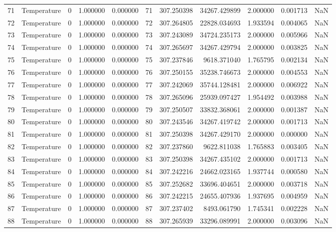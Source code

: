 \begin{tabular}{llrrrrrrrrr}
71 & Temperature & 0 & 1.000000 & 0.000000 & 71 & 307.250398 & 34267.429899 & 2.000000 & 0.001713 & NaN \\
72 & Temperature & 0 & 1.000000 & 0.000000 & 72 & 307.264805 & 22828.034693 & 1.933594 & 0.004065 & NaN \\
73 & Temperature & 0 & 1.000000 & 0.000000 & 73 & 307.243089 & 34724.235173 & 2.000000 & 0.005966 & NaN \\
74 & Temperature & 0 & 1.000000 & 0.000000 & 74 & 307.265697 & 34267.429794 & 2.000000 & 0.003825 & NaN \\
75 & Temperature & 0 & 1.000000 & 0.000000 & 75 & 307.237846 & 9618.371040 & 1.765795 & 0.002134 & NaN \\
76 & Temperature & 0 & 1.000000 & 0.000000 & 76 & 307.250155 & 35238.746673 & 2.000000 & 0.004553 & NaN \\
77 & Temperature & 0 & 1.000000 & 0.000000 & 77 & 307.242069 & 35744.128481 & 2.000000 & 0.006922 & NaN \\
78 & Temperature & 0 & 1.000000 & 0.000000 & 78 & 307.265096 & 25939.097427 & 1.954492 & 0.003988 & NaN \\
79 & Temperature & 0 & 1.000000 & 0.000000 & 79 & 307.250507 & 33832.368061 & 2.000000 & 0.001387 & NaN \\
80 & Temperature & 0 & 1.000000 & 0.000000 & 80 & 307.243546 & 34267.419742 & 2.000000 & 0.001713 & NaN \\
81 & Temperature & 0 & 1.000000 & 0.000000 & 81 & 307.250398 & 34267.429170 & 2.000000 & 0.000000 & NaN \\
82 & Temperature & 0 & 1.000000 & 0.000000 & 82 & 307.237860 & 9622.811038 & 1.765883 & 0.003405 & NaN \\
83 & Temperature & 0 & 1.000000 & 0.000000 & 83 & 307.250398 & 34267.435102 & 2.000000 & 0.001713 & NaN \\
84 & Temperature & 0 & 1.000000 & 0.000000 & 84 & 307.242216 & 24662.023165 & 1.937744 & 0.000580 & NaN \\
85 & Temperature & 0 & 1.000000 & 0.000000 & 85 & 307.252682 & 33696.404651 & 2.000000 & 0.003718 & NaN \\
86 & Temperature & 0 & 1.000000 & 0.000000 & 86 & 307.242215 & 24655.407936 & 1.937695 & 0.004959 & NaN \\
87 & Temperature & 0 & 1.000000 & 0.000000 & 87 & 307.237402 & 8493.061790 & 1.745341 & 0.002228 & NaN \\
88 & Temperature & 0 & 1.000000 & 0.000000 & 88 & 307.265939 & 33296.089991 & 2.000000 & 0.003096 & NaN \\

\end{tabular}
